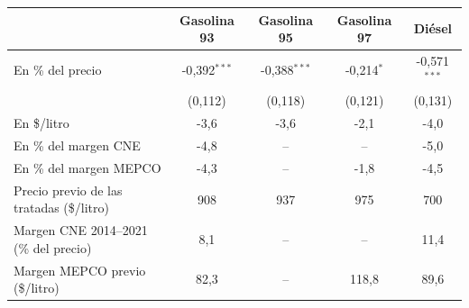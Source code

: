\begin{tabular}{lcccc}
\toprule
 & Gasolina 93 & Gasolina 95 & Gasolina 97 & Diésel \\
\midrule
En \% del precio & -0{,}392$^{***}$ & -0{,}388$^{***}$ & -0{,}214$^{*}$ & -0{,}571$^{***}$ \\
 & (0{,}112) & (0{,}118) & (0{,}121) & (0{,}131) \\
En \$/litro & -3{,}6 & -3{,}6 & -2{,}1 & -4{,}0 \\
En \% del margen CNE & -4{,}8 & -- & -- & -5{,}0 \\
En \% del margen MEPCO & -4{,}3 & -- & -1{,}8 & -4{,}5 \\
\midrule
Precio previo de las tratadas (\$/litro) & 908 & 937 & 975 & 700 \\
Margen CNE 2014--2021 (\% del precio) & 8{,}1 & -- & -- & 11{,}4 \\
Margen MEPCO previo (\$/litro) & 82{,}3 & -- & 118{,}8 & 89{,}6 \\
\bottomrule
\end{tabular}

